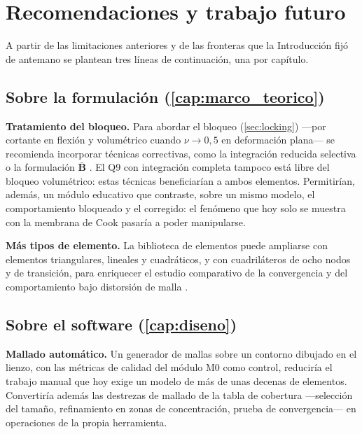 \section*{Recomendaciones y trabajo futuro}

A partir de las limitaciones anteriores y de las fronteras que la Introducción fijó de antemano se plantean tres líneas de continuación, una por capítulo.

\subsection*{Sobre la formulación (\autoref{cap:marco_teorico})}

\textbf{Tratamiento del bloqueo.} Para abordar el bloqueo (\autoref{sec:locking}) —por cortante en flexión y volumétrico cuando $\nu \to 0{,}5$ en deformación plana— se recomienda incorporar técnicas correctivas, como la integración reducida selectiva o la formulación $\bar{\bm{B}}$ \autocites[pp.~221, 232-234]{hughes2000fem}[pp.~476-477]{bathe2014fem}. El Q9 con integración completa tampoco está libre del bloqueo volumétrico: estas técnicas beneficiarían a ambos elementos. Permitirían, además, un módulo educativo que contraste, sobre un mismo modelo, el comportamiento bloqueado y el corregido: el fenómeno que hoy solo se muestra con la membrana de Cook pasaría a poder manipularse.

\textbf{Más tipos de elemento.} La biblioteca de elementos puede ampliarse con elementos triangulares, lineales y cuadráticos, y con cuadriláteros de ocho nodos y de transición, para enriquecer el estudio comparativo de la convergencia y del comportamiento bajo distorsión de malla \autocites[pp.~167-174, 194]{onate2009structural}{reddy2006introduction}.

\subsection*{Sobre el software (\autoref{cap:diseno})}

\textbf{Mallado automático.} Un generador de mallas sobre un contorno dibujado en el lienzo, con las métricas de calidad del módulo M0 como control, reduciría el trabajo manual que hoy exige un modelo de más de unas decenas de elementos. Convertiría además las destrezas de mallado de la tabla de cobertura —selección del tamaño, refinamiento en zonas de concentración, prueba de convergencia— en operaciones de la propia herramienta.

